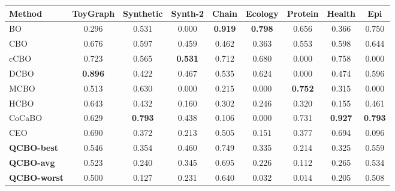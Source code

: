 \begin{tabular}{@{}lcccccccc@{}}
\toprule
\textbf{Method} & ToyGraph & Synthetic & Synth-2 & Chain & Ecology & Protein & Health & Epi \\
\midrule
BO & 0.296 & 0.531 & 0.000 & \textbf{0.919} & \textbf{0.798} & 0.656 & 0.366 & 0.750 \\
CBO & 0.676 & 0.597 & 0.459 & 0.462 & 0.363 & 0.553 & 0.598 & 0.644 \\
cCBO & 0.723 & 0.565 & \textbf{0.531} & 0.712 & 0.680 & 0.000 & 0.758 & 0.000 \\
DCBO & \textbf{0.896} & 0.422 & 0.467 & 0.535 & 0.624 & 0.000 & 0.474 & 0.596 \\
MCBO & 0.513 & 0.630 & 0.000 & 0.215 & 0.000 & \textbf{0.752} & 0.315 & 0.000 \\
HCBO & 0.643 & 0.432 & 0.160 & 0.302 & 0.246 & 0.320 & 0.155 & 0.461 \\
CoCaBO & 0.629 & \textbf{0.793} & 0.438 & 0.106 & 0.000 & 0.731 & \textbf{0.927} & \textbf{0.793} \\
CEO & 0.690 & 0.372 & 0.213 & 0.505 & 0.151 & 0.377 & 0.694 & 0.096 \\
\midrule
\textbf{QCBO-best} & 0.546 & 0.354 & 0.460 & 0.749 & 0.335 & 0.214 & 0.325 & 0.559 \\
\textbf{QCBO-avg} & 0.523 & 0.240 & 0.345 & 0.695 & 0.226 & 0.112 & 0.265 & 0.534 \\
\textbf{QCBO-worst} & 0.500 & 0.127 & 0.231 & 0.640 & 0.032 & 0.014 & 0.205 & 0.508 \\
\bottomrule
\end{tabular}

